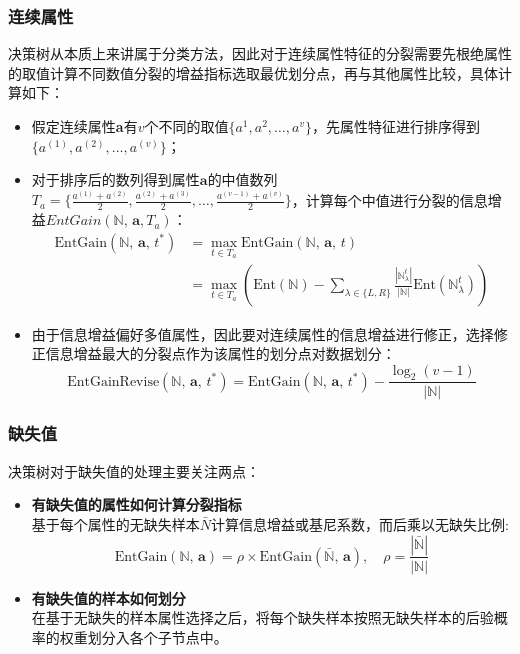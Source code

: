 \documentclass[a4paper]{article}
\begin{document}
		\subsubsection{连续属性}
			决策树从本质上来讲属于分类方法，因此对于连续属性特征的分裂需要先根绝属性的取值计算不同数值分裂的增益指标选取最优划分点，再与其他属性比较，具体计算如下：
			\begin{itemize}
				\item 	假定连续属性\textbf{a}有$v$个不同的取值$\{a^1,a^2,\dots,a^v\}$，先属性特征进行排序得到$\{a^{(1)},a^{(2)},\dots,a^{(v)}\}$；
				\item 	对于排序后的数列得到属性$\textbf{a}$的中值数列$T_a = \{\frac{a^{(1)}+a^{(2)}}{2},\frac{a^{(2)}+a^{(3)}}{2},\dots,\frac{a^{(v-1)}+a^{(v)}}{2}\}$，计算每个中值进行分裂的信息增益$EntGain(\mathbb{N},\,\textbf{a}, T_a)$：
					\begin{align*}
						\text{EntGain}(\mathbb{N},\,\textbf{a},\,t^*) 
								& = \max_{t\in T_a} \text{EntGain}(\mathbb{N},\,\textbf{a},\,t)\\
                    			& = \max_{t\in T_a} \left(\text{Ent}\left(\mathbb{N}\right) - 
                    				\sum_{\lambda \in \{L,R\}}\frac{|\mathbb{N}_\lambda^t|}{|\mathbb{N}|}\text{Ent}\left(\mathbb{N}_\lambda^t\right)\right)
					\end{align*}
				\item 	由于信息增益偏好多值属性，因此要对连续属性的信息增益进行修正，选择修正信息增益最大的分裂点作为该属性的划分点对数据划分：
					$$\text{EntGainRevise}(\mathbb{N},\,\textbf{a},\,t^*)  = \text{EntGain}(\mathbb{N},\,\textbf{a},\,t^*) - \frac{\log_2(v-1)}{|\mathbb{N}|}$$
			\end{itemize}
		\subsubsection{缺失值}
			决策树对于缺失值的处理主要关注两点：
			\begin{itemize}
	        	\item 	\textbf{有缺失值的属性如何计算分裂指标}\\
	            	基于每个属性的无缺失样本$\bar{N}$计算信息增益或基尼系数，而后乘以无缺失比例:
	            	$$\text{EntGain}(\mathbb{N},\,\textbf{a}) = \rho \times \text{EntGain}(\bar{\mathbb{N}},\,\textbf{a}),\quad \rho = \frac{|\bar{\mathbb{N}}|}{|\mathbb{N}|}$$
	          	\item	\textbf{有缺失值的样本如何划分}\\
	            	在基于无缺失的样本属性选择之后，将每个缺失样本按照无缺失样本的后验概率的权重划分入各个子节点中。	
	        \end{itemize}
\end{document}
